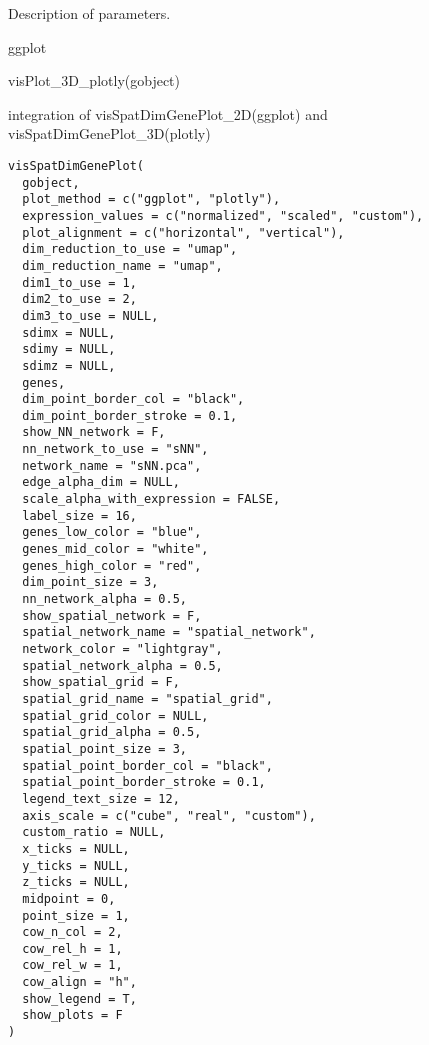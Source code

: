 \documentclass[a4paper]{book}
\begin{document}
%
\begin{Details}\relax
Description of parameters.
\end{Details}
%
\begin{Value}
ggplot
\end{Value}
%
\begin{Examples}
\begin{ExampleCode}
    visPlot_3D_plotly(gobject)
\end{ExampleCode}
\end{Examples}
%
\begin{Description}\relax
integration of visSpatDimGenePlot\_2D(ggplot) and visSpatDimGenePlot\_3D(plotly)
\end{Description}
%
\begin{Usage}
\begin{verbatim}
visSpatDimGenePlot(
  gobject,
  plot_method = c("ggplot", "plotly"),
  expression_values = c("normalized", "scaled", "custom"),
  plot_alignment = c("horizontal", "vertical"),
  dim_reduction_to_use = "umap",
  dim_reduction_name = "umap",
  dim1_to_use = 1,
  dim2_to_use = 2,
  dim3_to_use = NULL,
  sdimx = NULL,
  sdimy = NULL,
  sdimz = NULL,
  genes,
  dim_point_border_col = "black",
  dim_point_border_stroke = 0.1,
  show_NN_network = F,
  nn_network_to_use = "sNN",
  network_name = "sNN.pca",
  edge_alpha_dim = NULL,
  scale_alpha_with_expression = FALSE,
  label_size = 16,
  genes_low_color = "blue",
  genes_mid_color = "white",
  genes_high_color = "red",
  dim_point_size = 3,
  nn_network_alpha = 0.5,
  show_spatial_network = F,
  spatial_network_name = "spatial_network",
  network_color = "lightgray",
  spatial_network_alpha = 0.5,
  show_spatial_grid = F,
  spatial_grid_name = "spatial_grid",
  spatial_grid_color = NULL,
  spatial_grid_alpha = 0.5,
  spatial_point_size = 3,
  spatial_point_border_col = "black",
  spatial_point_border_stroke = 0.1,
  legend_text_size = 12,
  axis_scale = c("cube", "real", "custom"),
  custom_ratio = NULL,
  x_ticks = NULL,
  y_ticks = NULL,
  z_ticks = NULL,
  midpoint = 0,
  point_size = 1,
  cow_n_col = 2,
  cow_rel_h = 1,
  cow_rel_w = 1,
  cow_align = "h",
  show_legend = T,
  show_plots = F
)
\end{verbatim}
\end{Usage}
%
\end{document}
